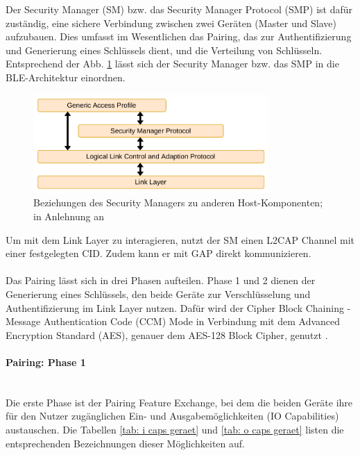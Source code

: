 Der Security Manager (SM) bzw. das Security Manager Protocol (SMP) ist dafür zuständig, eine sichere Verbindung zwischen zwei Geräten (Master und Slave) aufzubauen. Dies umfasst im Wesentlichen das Pairing, das zur Authentifizierung und Generierung eines Schlüssels dient, und die Verteilung von Schlüsseln. Entsprechend der Abb. \ref{fig: smp in bt} lässt sich der Security Manager bzw. das SMP in die BLE-Architektur einordnen.

\begin{figure}[H]
    \centering
    \includegraphics[width=0.8\textwidth]{graphics/smp_in_bt.pdf}
    \caption[Beziehungen des Security Managers zu anderen Host-Komponenten]{Beziehungen des Security Managers zu anderen Host-Komponenten; in Anlehnung an \cite{BtSpec4.0_fig_1958}}
    \label{fig: smp in bt}
\end{figure}

Um mit dem Link Layer zu interagieren, nutzt der SM einen L2CAP Channel mit einer festgelegten CID. Zudem kann er mit GAP direkt kommunizieren.
\\\\
Das Pairing lässt sich in drei Phasen aufteilen. Phase 1 und 2 dienen der Generierung eines Schlüssels, den beide Geräte zur Verschlüsselung und Authentifizierung im Link Layer nutzen. Dafür wird der Cipher Block Chaining - Message Authentication Code (CCM) Mode in Verbindung mit dem Advanced Encryption Standard (AES), genauer dem AES-128 Block Cipher, genutzt \cite{BtSpec4.0_2285}.

\paragraph{Pairing: Phase 1} \mbox{} \vspace{0.2cm} \\
Die erste Phase ist der Pairing Feature Exchange, bei dem die beiden Geräte ihre für den Nutzer zugänglichen Ein- und Ausgabemöglichkeiten (IO Capabilities) austauschen. Die Tabellen \ref{tab: i caps geraet} und \ref{tab: o caps geraet} 
listen die entsprechenden Bezeichnungen dieser Möglichkeiten auf.
\\\\

